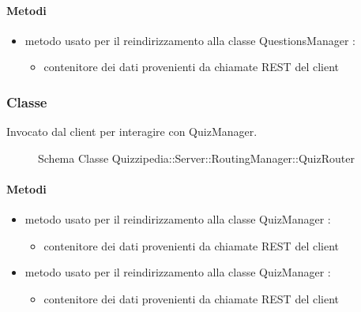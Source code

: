 \paragraph{Metodi}
\begin{itemize}
\item {}
\newline
metodo usato per il reindirizzamento alla classe QuestionsManager
\newline
{} :
\begin{itemize}
\item {}
\newline
contenitore dei dati provenienti da chiamate REST del client
\end{itemize}
\end{itemize}
\subsubsection{Classe }
Invocato dal client per interagire con QuizManager.
\begin{figure}[H]
\centering
\noindent{}
\caption[Schema Classe QuizRouter]{Schema Classe Quizzipedia::Server::RoutingManager::QuizRouter}
\end{figure}
\paragraph{Metodi}
\begin{itemize}
\item {}
\newline
metodo usato per il reindirizzamento alla classe QuizManager
\newline
{} :
\begin{itemize}
\item {}
\newline
contenitore dei dati provenienti da chiamate REST del client
\end{itemize}
\item {}
\newline
metodo usato per il reindirizzamento alla classe QuizManager
\newline
{} :
\begin{itemize}
\item {}
\newline
contenitore dei dati provenienti da chiamate REST del client
\end{itemize}
\end{itemize}
